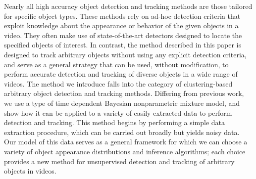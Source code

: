 \documentclass{article}
\begin{document}
Nearly all high accuracy object detection and tracking methods are those tailored for specific object types. These methods rely on ad-hoc detection criteria that exploit knowledge about the appearance or behavior of the given objects in a video. They often make use of state-of-the-art detectors designed to locate the specified objects of interest. In contrast, the method described in this paper is designed to track arbitrary objects without using any explicit detection criteria, and serve as a general strategy that can be used, without modification, to perform accurate detection and tracking of diverse objects in a wide range of videos. The method we introduce falls into the category of clustering-based arbitrary object detection and tracking methods. Differing from previous work, we use a type of time dependent Bayesian nonparametric mixture model, and show how it can be applied to a variety of easily extracted data to perform detection and tracking. This method begins by performing a simple data extraction procedure, which can be carried out broadly but yields noisy data. Our model of this data serves as a general framework for which we can choose a variety of object appearance distributions and inference algorithms; each choice provides a new method for unsupervised detection and tracking of arbitrary objects in videos.


\end{document}
